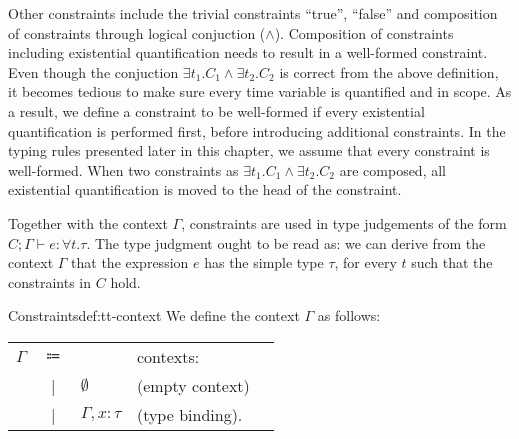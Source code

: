Other constraints include the trivial constraints ``true'', ``false'' and composition of constraints through logical conjuction ($\land$).
Composition of constraints including existential quantification needs to result in a well-formed constraint.
Even though the conjuction $\exists t_1.C_1 \land \exists t_2.C_2$ is correct from the above definition, it becomes tedious to make sure every time variable is quantified and in scope.
As a result, we define a constraint to be well-formed if every existential quantification is performed first, before introducing additional constraints.
In the typing rules presented later in this chapter, we assume that every constraint is well-formed.
When two constraints as $\exists t_1.C_1 \land \exists t_2.C_2$ are composed, all existential quantification is moved to the head of the constraint.

Together with the context $\Gamma$, constraints are used in type judgements of the form $C; \Gamma \vdash e : \forall t. \tau$.
The type judgment ought to be read as: we can derive from the context $\Gamma$ that the expression $e$ has the simple type $\tau$, for every $t$ such that the constraints in $C$ hold.

\begin{definitiontitled}{Constraints}{def:tt-context}
We define the context $\Gamma$ as follows:\\
\begin{tabularx}{0.75\textwidth}{lc X lr}
$\Gamma$& $\Coloneqq$ &                                         & contexts:           \\
        & |     & $\emptyset$                                   & (empty context)     \\
        & |     & $\Gamma,x:\tau$                               & (type binding).     \\
\end{tabularx}\\
\end{definitiontitled}

